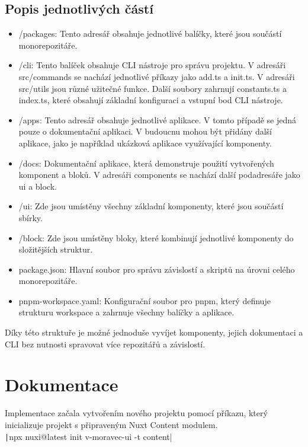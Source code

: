 \subsection{Popis jednotlivých částí}

\begin{itemize}
    \item /packages: Tento adresář obsahuje jednotlivé balíčky, které jsou součástí monorepozitáře.
    \item /cli: Tento balíček obsahuje CLI nástroje pro správu projektu. V adresáři src/commands se nachází jednotlivé příkazy jako add.ts a init.ts. V adresáři src/utils jsou různé užitečné funkce. Další soubory zahrnují constants.ts a index.ts, které obsahují základní konfiguraci a vstupní bod CLI nástroje.
    \item /apps: Tento adresář obsahuje jednotlivé aplikace. V tomto případě se jedná pouze o dokumentační aplikaci. V budoucnu mohou být přidány další aplikace, jako je například ukázková aplikace využívající komponenty.
    \item /docs: Dokumentační aplikace, která demonstruje použití vytvořených komponent a bloků. V adresáři components se nachází další podadresáře jako ui a block.
    \item /ui: Zde jsou umístěny všechny základní komponenty, které jsou součástí sbírky.
    \item /block: Zde jsou umístěny bloky, které kombinují jednotlivé komponenty do složitějších struktur.
    \item package.json: Hlavní soubor pro správu závislostí a skriptů na úrovni celého monorepozitáře.
    \item pnpm-workspace.yaml: Konfigurační soubor pro pnpm, který definuje strukturu workspace a zahrnuje všechny balíčky a aplikace.
\end{itemize}

Díky této struktuře je možné jednoduše vyvíjet komponenty, jejich dokumentaci a CLI bez nutnosti spravovat více repozitářů a závislostí.

\section{Dokumentace}
Implementace začala vytvořením nového projektu pomocí příkazu, který inicializuje projekt s připraveným Nuxt Content modulem.\\

\texttt|npx nuxi@latest init v-moravec-ui -t content|\\

